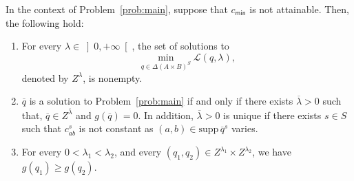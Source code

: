 \documentclass[smallextended,referee,envcountsect,]{svjour3}
\newcommand{\RPP}{\ensuremath{\left]0,+\infty\right[}}
\newcommand{\supp}{\mathrm{supp}\,}
\begin{document}
\begin{proposition}
\label{p:saddle}
In the context of Problem~\ref{prob:main}, suppose that 
$c_{\mathsf{min}}$ is not attainable.
Then, the following hold:
\begin{enumerate}
\item 
\label{p:saddle0}
For every 
$\lambda\in\RPP$,
the set of 
solutions to 
\begin{equation}
\label{e:minlam2}
\min_{q\in \Delta(A\times B)^S}
\mathcal{L}(q,\lambda),
\end{equation}
denoted by $Z^{\lambda}$, is nonempty.
%
\item 
\label{p:saddleii}
$\overline{q}$ is a solution to 
Problem~\ref{prob:main} if and only if
there exists 
$\overline{\lambda}>0$ such that, $\overline{q}\in 
Z^{\overline{\lambda}}$ and
$g(\overline{q})=0$. In addition, $\overline{\lambda}>0$ is 
unique if there 
exists $s\in S$ such 
that $c_{ab}^s$ is not constant as $(a,b)\in\supp \overline{q}^s$ 
varies.
\item 
\label{p:saddlei}
For every $0<\lambda_1<\lambda_2$, and every $(q_1,q_2)\in 
Z^{\lambda_1}\times Z^{\lambda_2}$, we have
$g(q_1)\ge g(q_2)$.
\end{enumerate}
\end{proposition}
\end{document}
